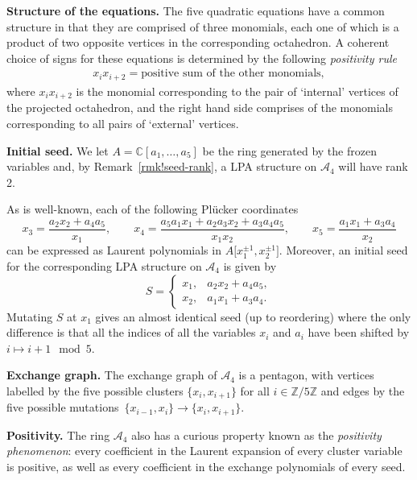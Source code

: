 \documentclass[10pt,a4paper]{amsart}
\numberwithin{equation}{section}
\theoremstyle{definition}
\newcommand{\CC}{\mathbb{C}}
\newcommand{\ZZ}{\mathbb{Z}}
\begin{document}
{\bf Structure of the equations.}
The five quadratic equations have a common structure in that they are comprised of three monomials, each one of which is a product of two opposite vertices in the corresponding octahedron. A coherent choice of signs for these equations is determined by the following \emph{positivity rule}
\begin{gather} x_ix_{i+2}=\text{positive sum of the other monomials}, \label{eq!positivity} \end{gather}
where $x_ix_{i+2}$ is the monomial corresponding to the pair of `internal' vertices of the projected octahedron, and the right hand side comprises of the monomials corresponding to all pairs of `external' vertices.

{\bf Initial seed.}
We let $A= \CC[a_1,\ldots,a_5]$ be the ring generated by the frozen variables and, by Remark~\ref{rmk!seed-rank}, a LPA structure on $\mathcal A_4$ will have rank 2.

As is well-known, each of the following Pl\"ucker coordinates
\[ x_3 = \frac{a_2x_2 + a_4a_5}{x_1}, \qquad x_4 = \frac{a_5a_1x_1 + a_2a_3x_2 + a_3a_4a_5}{x_1x_2}, \qquad x_5 = \frac{a_1x_1 + a_3a_4}{x_2} \]
can be expressed as Laurent polynomials in $A\big[x_1^{\pm1},x_2^{\pm1}\big]$. Moreover, an initial seed for the corresponding LPA structure on $\mathcal A_4$ is given by
\[ S = \begin{cases}
x_1, & a_2x_2 + a_4a_5, \\
x_2, & a_1x_1 + a_3a_4.
\end{cases} \]
Mutating $S$ at $x_1$ gives an almost identical seed (up to reordering) where the only difference is that all the indices of all the variables $x_i$ and $a_i$ have been shifted by $i\mapsto i+1\mod 5$.

{\bf Exchange graph.}
The exchange graph of $\mathcal A_4$ is a pentagon, with vertices labelled by the five possible clusters $\{x_i,x_{i+1}\}$ for all $i\in \ZZ/5\ZZ$ and edges by the five possible mutations~${\{x_{i-1},x_i\}\to\{x_i,x_{i+1}\}}$.

{\bf Positivity.}
The ring $\mathcal A_4$ also has a curious property known as the \emph{positivity phenomenon}: every coefficient in the Laurent expansion of every cluster variable is positive, as well as every coefficient in the exchange polynomials of every seed.
\end{document}
